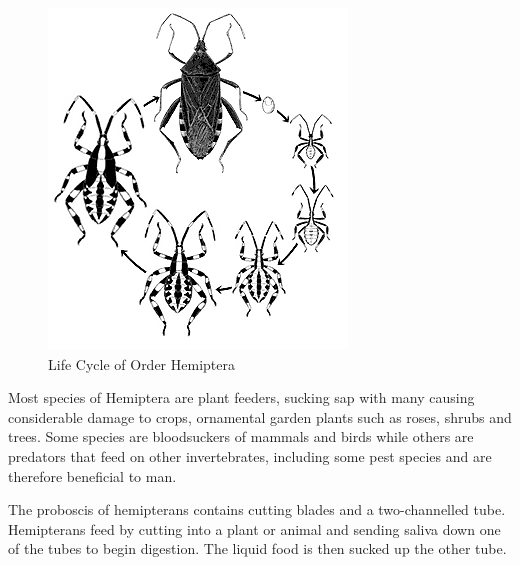 \documentclass[journal]{./IEEE/IEEEtran}
\begin{document}
				\begin{figure}[h!]
			  		\centering
					\includegraphics[scale=0.5]{images/bug_life_cycle.png}
					\caption{Life Cycle of Order Hemiptera}
				\end{figure}

		Most species of Hemiptera are plant feeders, sucking sap with many causing considerable damage to crops, ornamental garden plants such as roses, shrubs and trees. Some species are bloodsuckers of mammals and birds while others are predators that feed on other invertebrates, including some pest species and are therefore beneficial to man.

		The proboscis of hemipterans contains cutting blades and a two-channelled tube. Hemipterans feed by cutting into a plant or animal and sending saliva down one of the tubes to begin digestion. The liquid food is then sucked up the other tube.\cite{electronic_bugs}
\end{document}
